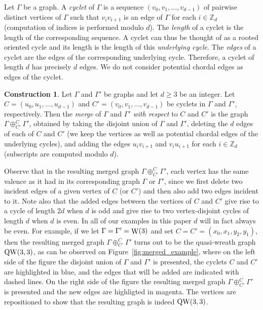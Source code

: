 \documentclass[11 pt,english]{article}
\newcommand{\ZZ}{\mathbb{Z}}
\newcommand{\G}{\Gamma}
\newcommand{\Wr}{\mathop{\rm W}}
\newcommand{\QWr}{\mathop{\rm QW}}
\theoremstyle{definition}
\newtheorem{construction}[theorem]{Construction}
\begin{document}
Let $\G$ be a graph. A {\em cyclet} of $\G$ is a sequence $(v_0, v_1, \ldots , v_{d-1})$ of pairwise distinct vertices of $\G$ such that $v_i v_{i+1}$ is an edge of $\G$ for each $i \in \ZZ_{d}$ (computation of indices is performed modulo $d$). The {\em length} of a cyclet is the length of the corresponding sequence. A cyclet can thus be thought of as a rooted oriented cycle and its length is the length of this {\em underlying cycle}. The {\em edges} of a cyclet are the edges of the corresponding underlying cycle. Therefore, a cyclet of length $d$ has precisely $d$ edges. We do not consider potential chordal edges as edges of the cyclet.

\begin{construction}
\label{con:general}
Let $\G$ and $\G'$ be graphs and let $d \geq 3$ be an integer. Let $C = (u_0, u_1, \ldots , u_{d-1})$ and $C' = (v_0, v_1, \ldots , v_{d - 1})$ be cyclets in $\G$ and $\G'$, respectively. Then the {\em merge} of $\G$ and $\G'$ {\em with respect} to $C$ and $C'$ is the graph $\G\oplus^{C}_{C'} \G'$, obtained by taking the disjoint union of $\G$ and $\G'$, deleting the $d$ edges of each of $C$ and $C'$ (we keep the vertices as well as potential chordal edges of the underlying cycles), and adding the edges $u_i v_{i+1}$ and $v_i u_{i+1}$ for each $i \in \ZZ_{d}$ (subscripts are computed modulo $d$).
\end{construction} 

Observe that in the resulting merged graph $\G\oplus^{C}_{C'} \G'$, each vertex has the same valence as it had in its corresponding graph $\G$ or $\G'$, since we first delete two incident edges of a given vertex of $C$ (or $C'$) and then also add two edges incident to it. Note also that the added edges between the vertices of $C$ and $C'$ give rise to a cycle of length $2d$ when $d$ is odd and give rise to two vertex-disjoint cycles of length $d$ when $d$ is even. In all of our examples in this paper $d$ will in fact always be even. For example, if we let $\G = \G' = \Wr(3)$ and set $C = C' = (x_0,x_1,y_2,y_1)$, then the resulting merged graph $\G\oplus^{C}_{C'} \G'$ turns out to be the quasi-wreath graph $\QWr(3,3)$, as can be observed on Figure~\ref{fig:merged_example}, where on the left side of the figure the disjoint union of $\G$ and $\G'$ is presented, the cyclets $C$ and $C'$ are highlighted in blue, and the edges that will be added are indicated with dashed lines. On the right side of the figure the resulting merged graph $\G\oplus^{C}_{C'} \G'$ is presented and the new edges are highligted in magenta. The vertices are repositioned to show that the resulting graph is indeed $\QWr(3,3)$.
\end{document}
